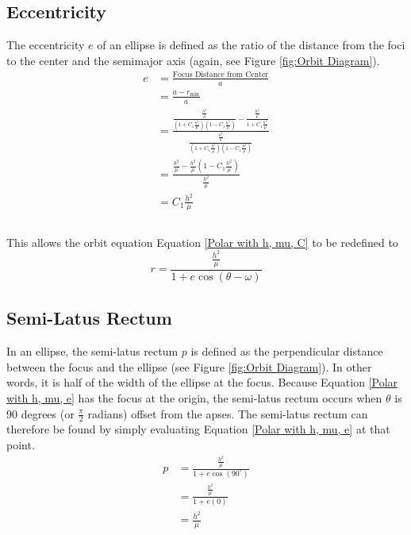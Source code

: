 \documentclass{article}
\begin{document}
\subsection{Eccentricity}

The eccentricity $e$ of an ellipse is defined as the ratio of the distance from the foci to the center and the semimajor axis (again, see Figure \ref{fig:Orbit Diagram}).
\begin{align*}
    e & =\frac{\text{Focus Distance from Center}}{a}                                                                                                                                                    \\
      & =\frac{a-r_\text{min}}{a}                                                                                                                                                                       \\
      & =\frac{\frac{\frac{h^2}{\mu}}{(1+C_1\frac{h^2}{\mu})(1-C_1\frac{h^2}{\mu})}-\frac{\frac{h^2}{\mu}}{1+C_1\frac{h^2}{\mu}}}{\frac{\frac{h^2}{\mu}}{(1+C_1\frac{h^2}{\mu})(1-C_1\frac{h^2}{\mu})}} \\
      & =\frac{\frac{h^2}{\mu}-\frac{h^2}{\mu}(1-C_1\frac{h^2}{\mu})}{\frac{h^2}{\mu}}                                                                                                                  \\
      & =C_1\frac{h^2}{\mu}                                                                                                                                                                             \\ \\
\end{align*}

This allows the orbit equation Equation \eqref{Polar with h, mu, C} to be redefined to
\begin{equation}\label{Polar with h, mu, e}
    r=\frac{\frac{h^2}{\mu}}{1+e\cos(\theta-\omega)}
\end{equation}

\subsection{Semi-Latus Rectum}

In an ellipse, the semi-latus rectum $p$ is defined as the perpendicular distance between the focus and the ellipse (see Figure \ref{fig:Orbit Diagram}). In other words, it is half of the width of the ellipse at the focus. Because Equation \eqref{Polar with h, mu, e} has the focus at the origin, the semi-latus rectum occurs when $\theta$ is 90 degrees (or $\frac{\pi}{2}$ radians) offset from the apses. The semi-latus rectum can therefore be found by simply evaluating Equation \eqref{Polar with h, mu, e} at that point.
\begin{align*}
    p & =\frac{\frac{h^2}{\mu}}{1+e\cos(90^\circ)} \\
      & =\frac{\frac{h^2}{\mu}}{1+e(0)}            \\
      & = \frac{h^2}{\mu}
\end{align*}
\end{document}
